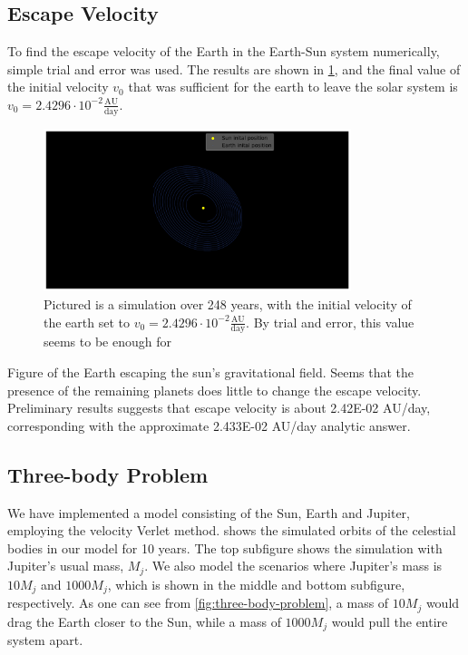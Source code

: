 \documentclass[../main.tex]{subfiles}
\begin{document}
\subsection{Escape Velocity}

To find the escape velocity of the Earth in the Earth-Sun system numerically, simple trial and error was used. The results are shown in \cref{fig:earth-escape-velocity}, and the final value of the initial velocity $v_0$ that was sufficient for the earth to leave the solar system is $v_0 = 2.4296 \cdot 10^{-2} \frac{\text{AU}}{\text{day}}$.

\begin{figure}[htb!]
    \centering
    \includegraphics[trim=15cm 5.cm 11cm 0.cm, clip,width=0.8\textwidth]{../figures/Euler_Earth_Sun.pdf}
    \caption{Pictured is a simulation over 248 years, with the initial velocity of the earth set to $v_0 = 2.4296 \cdot 10^{-2} \frac{\text{AU}}{\text{day}}$. By trial and error, this value seems to be enough for }
    \label{fig:earth-escape-velocity}
\end{figure}

Figure of the Earth escaping the sun's gravitational field. Seems that the presence of the remaining planets does little to change the escape velocity. Preliminary results suggests that escape velocity is about 2.42E-02 AU/day, corresponding with the approximate 2.433E-02 AU/day analytic answer.

\subsection{Three-body Problem}
We have implemented a model consisting of the Sun, Earth and Jupiter, employing the velocity Verlet method.  shows the simulated orbits of the celestial bodies in our model for 10 years. The top subfigure shows the simulation with Jupiter's usual mass, $M_j$. We also model the scenarios where Jupiter's mass is $10M_j$ and $1000M_j$, which is shown in the middle and bottom subfigure, respectively. As one can see from \cref{fig:three-body-problem}, a mass of $10M_j$ would drag the Earth closer to the Sun, while a mass of $1000M_j$ would pull the entire system apart. 
\end{document}
